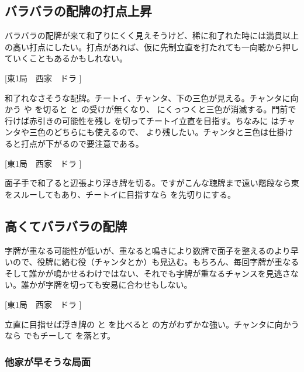\documentclass[../nankiru_main.tex]{subfiles}
\begin{document}

\subsection{バラバラの配牌の打点上昇}

バラバラの配牌が来て和了りにくく見えそうけど、稀に和了れた時には満貫以上の高い打点にしたい。打点があれば、仮に先制立直を打たれても一向聴から押していくこともあるかもしれない\citep[][pp. 40--47]{tetsusenryaku}。

[東1局　西家　ドラ ]

和了れなさそうな配牌。チートイ、チャンタ、下の三色が見える。チャンタに向かう  や  を切ると  と  の受けが無くなり、 にくっつくと三色が消滅する。門前で行けば赤引きの可能性を残し  を切ってチートイ立直を目指す。ちなみに  はチャンタや三色のどちらにも使えるので、 より残したい。チャンタと三色は仕掛けると打点が下がるので要注意である。

[東1局　西家　ドラ ]

面子手で和了ると辺張より浮き牌を切る。ですがこんな聴牌まで遠い階段なら東をスルーしてもあり、チートイに目指すなら  を先切りにする。

\subsection{高くてバラバラの配牌}

字牌が重なる可能性が低いが、重なると鳴きにより数牌で面子を整えるのより早いので、役牌に絡む役（チャンタとか）も見込む。もちろん、毎回字牌が重なるそして誰かが鳴かせるわけではない、それでも字牌が重なるチャンスを見逃さない。誰かが字牌を切っても安易に合わせもしない\citep[][pp. 56--63]{tetsusenryaku}。

[東1局　西家　ドラ ]

立直に目指せば浮き牌の  と  を比べると  の方がわずかな強い。チャンタに向かうなら  でもチーして  を落とす。

\subsubsection*{他家が早そうな局面}

\begin{rittai}[h]
  \centering
  
  
  \caption{手牌が多くて他家が早そうな局面}
  \label{rittai:joban-far}
\end{rittai}
\end{document}
